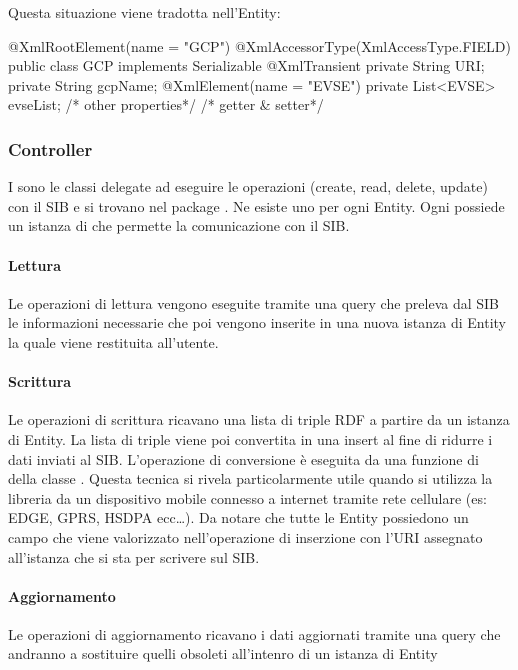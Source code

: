 Questa situazione viene tradotta nell'Entity:

\begin{java}[caption={Entity di esempio},label=lst:entity]
@XmlRootElement(name = "GCP")
@XmlAccessorType(XmlAccessType.FIELD)
public class GCP implements Serializable {
	@XmlTransient
	private String URI;
	private String gcpName;
	@XmlElement(name = "EVSE")
	private List<EVSE> evseList;
	/* other properties*/
	/* getter & setter*/	
}
\end{java}

\subsubsection{Controller}

I  sono le classi delegate ad eseguire le operazioni  (create, read, delete, update) con il SIB e si trovano nel package . Ne esiste uno per ogni Entity. Ogni  possiede un istanza di  che permette la comunicazione con il SIB. 

\paragraph{Lettura} Le operazioni di lettura vengono eseguite tramite una query  che preleva dal SIB le informazioni necessarie che poi vengono inserite in una nuova istanza di Entity la quale viene restituita all'utente.

\paragraph{Scrittura} Le operazioni di scrittura ricavano una lista di triple RDF a partire da un istanza di Entity. La lista di triple viene poi convertita in una  insert al fine di ridurre i dati inviati al SIB. L'operazione di conversione è eseguita da una funzione di della  classe . Questa tecnica si rivela particolarmente utile quando si utilizza la libreria da un dispositivo mobile connesso a internet tramite rete cellulare (es: EDGE, GPRS, HSDPA ecc\dots). Da notare che tutte le Entity possiedono un campo  che viene valorizzato nell'operazione di inserzione con l'URI assegnato all'istanza che si sta per scrivere sul SIB. 

\paragraph{Aggiornamento} Le operazioni di aggiornamento ricavano i dati aggiornati tramite una query  che andranno a sostituire quelli obsoleti all'intenro di un istanza di Entity

